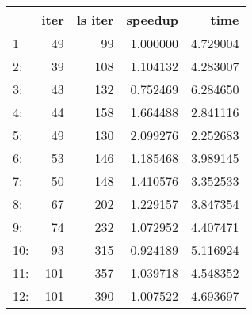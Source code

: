 \begin{tabular}{lrrrr}
\toprule
{} &  iter &  ls iter &   speedup &      time \\
\midrule
1   &    49 &       99 &  1.000000 &  4.729004 \\
2:  &    39 &      108 &  1.104132 &  4.283007 \\
3:  &    43 &      132 &  0.752469 &  6.284650 \\
4:  &    44 &      158 &  1.664488 &  2.841116 \\
5:  &    49 &      130 &  2.099276 &  2.252683 \\
6:  &    53 &      146 &  1.185468 &  3.989145 \\
7:  &    50 &      148 &  1.410576 &  3.352533 \\
8:  &    67 &      202 &  1.229157 &  3.847354 \\
9:  &    74 &      232 &  1.072952 &  4.407471 \\
10: &    93 &      315 &  0.924189 &  5.116924 \\
11: &   101 &      357 &  1.039718 &  4.548352 \\
12: &   101 &      390 &  1.007522 &  4.693697 \\
\bottomrule
\end{tabular}
